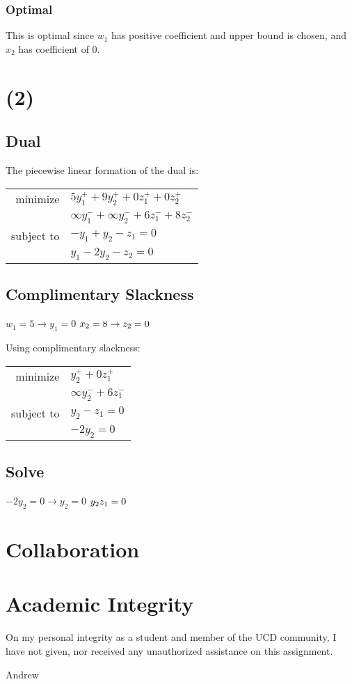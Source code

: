 \documentclass[14pt]{extarticle}
\begin{document}
\subsubsection*{Optimal}
This is optimal since $w_1$ has positive coefficient and upper bound is chosen, and $x_2$ has coefficient of 0.

\section*{(2)}
\subsection*{Dual}
The piecewise linear formation of the dual is:

\bigskip \begin{tabular}{r l}
    minimize & $5y_1^+ + 9y_2^+ + 0z_1^+ + 0z_2^+$ \\
    & $\infty y_1^- + \infty y_2^- + 6z_1^- + 8z_2^-$ \\
    subject to & $-y_1 + y_2 - z_1 = 0$ \\
    & $y_1 - 2y_2 - z_2 = 0$ \\
\end{tabular}

\subsection*{Complimentary Slackness}
$w_1 = 5 \to y_1 = 0$
$\\x_2 = 8 \to z_2 = 0$

\bigskip Using complimentary slackness:

\bigskip \begin{tabular}{r l}
    minimize & $y_2^+ + 0z_1^+$ \\
    & $\infty y_2^- + 6z_1^-$ \\
    subject to & $y_2 - z_1 = 0$ \\
    & $-2y_2 = 0$ \\
\end{tabular}

\subsection*{Solve}
$-2y_2 = 0 \to y_2 = 0$
$\\y_2z_1 = 0$


\section*{Collaboration}

\section*{Academic Integrity}
On my personal integrity as a student and member of the UCD community, I have not given, nor received any unauthorized assistance on this assignment.

\bigskip Andrew
\end{document}
